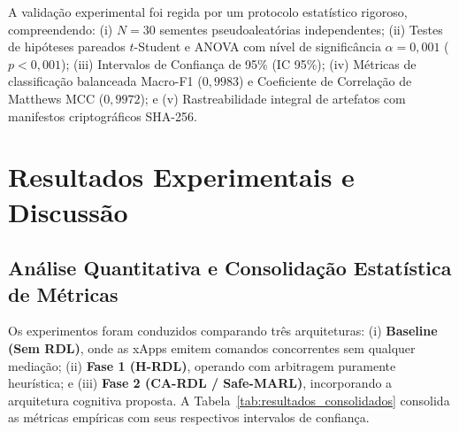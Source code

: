 \documentclass[12pt]{article}
\begin{document}
A validação experimental foi regida por um protocolo estatístico rigoroso, compreendendo: (i) $N = 30$ sementes pseudoaleatórias independentes; (ii) Testes de hipóteses pareados $t$-Student e ANOVA com nível de significância $\alpha = 0,001$ ($p < 0,001$); (iii) Intervalos de Confiança de 95\% (IC 95\%); (iv) Métricas de classificação balanceada Macro-F1 ($0,9983$) e Coeficiente de Correlação de Matthews MCC ($0,9972$); e (v) Rastreabilidade integral de artefatos com manifestos criptográficos SHA-256.

\section{Resultados Experimentais e Discussão}
\label{sec:resultados}

\subsection{Análise Quantitativa e Consolidação Estatística de Métricas}

Os experimentos foram conduzidos comparando três arquiteturas: (i) \textbf{Baseline (Sem RDL)}, onde as xApps emitem comandos concorrentes sem qualquer mediação; (ii) \textbf{Fase 1 (H-RDL)}, operando com arbitragem puramente heurística; e (iii) \textbf{Fase 2 (CA-RDL / Safe-MARL)}, incorporando a arquitetura cognitiva proposta. A Tabela~\ref{tab:resultados_consolidados} consolida as métricas empíricas com seus respectivos intervalos de confiança.
\end{document}
